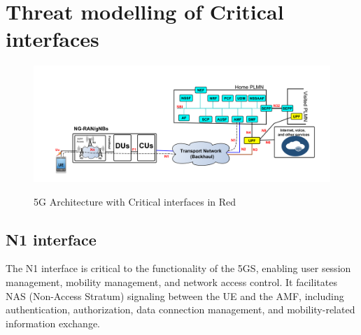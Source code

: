 \documentclass{report}
\begin{document}
\section{Threat modelling of Critical interfaces}
\begin{figure}[H]
    \centering
    \includegraphics[width=1\textwidth]{figures/interfaces.png}
    \caption{5G Architecture with Critical interfaces in Red }\cite{mahyoub2024security}
\end{figure}

\subsection{N1 interface}

The N1 interface is critical to the functionality of the 5GS, enabling user session management, mobility management, and network access control. It facilitates NAS (Non-Access Stratum) signaling between the UE and the AMF, including authentication, authorization, data connection management, and mobility-related information exchange.
\end{document}
